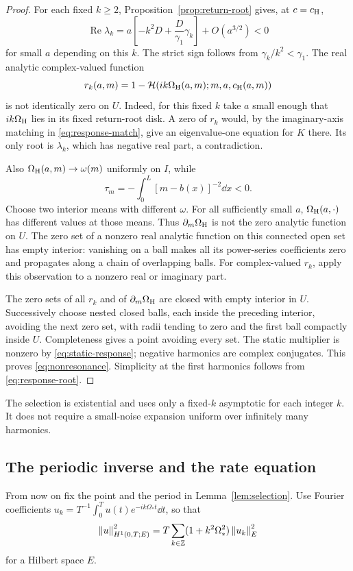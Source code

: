\begin{proof}
For each fixed $k\ge2$, Proposition~\ref{prop:return-root} gives, at
$c=c_{\mathrm H}$,
\[
 \operatorname{Re}\lambda_k
 =a\left[-k^2D+\frac D{\gamma_1}\gamma_k\right]+O(a^{3/2})<0
\]
for small $a$ depending on this $k$. The strict sign follows from
$\gamma_k/k^2<\gamma_1$. The real analytic complex-valued function
\[
 r_k(a,m)=1-\mathcal H(ik\Omega_{\mathrm H}(a,m);m,a,c_{\mathrm H}(a,m))
\]
is not identically zero on $U$. Indeed, for this fixed $k$ take $a$
small enough that $ik\Omega_{\mathrm H}$ lies in its fixed return-root disk.
A zero of $r_k$ would, by the imaginary-axis matching in
\eqref{eq:response-match}, give an eigenvalue-one equation for $K$
there. Its only root is $\lambda_k$, which has negative real part,
a contradiction.

Also $\Omega_{\mathrm H}(a,m)\to\omega(m)$ uniformly on $I$, while
\[
 \tau_m=-\int_0^L[m-b(x)]^{-2}\dd x<0.
\]
Choose two interior means with different $\omega$. For all sufficiently
small $a$, $\Omega_{\mathrm H}(a,\cdot)$ has different values at those means.
Thus $\partial_m\Omega_{\mathrm H}$ is not the zero analytic function on $U$.
The zero set of a nonzero real analytic function on this connected
open set has empty interior: vanishing on a ball makes all its
power-series coefficients zero and propagates along a chain of
overlapping balls. For complex-valued $r_k$, apply this observation
to a nonzero real or imaginary part.

The zero sets of all $r_k$ and of $\partial_m\Omega_{\mathrm H}$ are closed with
empty interior in $U$. Successively choose nested closed balls,
each inside the preceding interior, avoiding the next zero set,
with radii tending to zero and the first ball compactly inside $U$.
Completeness gives a point avoiding every set. The static multiplier
is nonzero by \eqref{eq:static-response}; negative harmonics are
complex conjugates. This proves \eqref{eq:nonresonance}.
Simplicity at the first harmonics follows from
\eqref{eq:response-root}.
\end{proof}

The selection is existential and uses only a fixed-$k$ asymptotic
for each integer $k$. It does not require a small-noise expansion
uniform over infinitely many harmonics.

\subsection{The periodic inverse and the rate equation}

From now on fix the point and the period in Lemma~\ref{lem:selection}.
Use Fourier coefficients
$u_k=T^{-1}\int_0^T u(t)e^{-ik\Omega_*t}\dd t$, so that
\[
 \left\|u\right\|_{H^1(0,T;E)}^2
   =T\sum_{k\in\mathbb Z}(1+k^2\Omega_*^2)\left\|u_k\right\|_E^2
\]
for a Hilbert space $E$.

